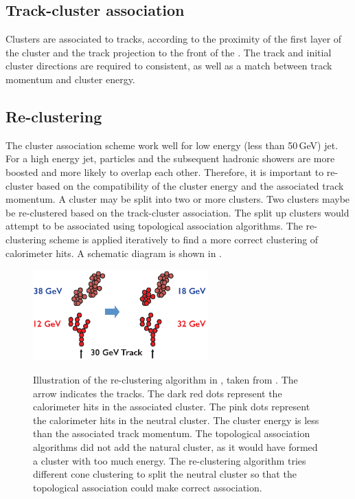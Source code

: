 \subsection{Track-cluster association}

Clusters are associated to tracks, according to the proximity of the first layer of the cluster and the track projection to the front of the \ECAL. The track and initial cluster directions are required to consistent, as well as a match between track momentum and cluster energy.



\subsection{Re-clustering}

The cluster association scheme work well for low energy (less than 50\,GeV) jet. For a high energy jet, particles and the subsequent hadronic showers are more boosted and more likely to overlap each other. Therefore, it is important to re-cluster based on the compatibility of the cluster energy and the associated track momentum. A cluster may be split into two or more clusters. Two clusters maybe be re-clustered based on the track-cluster association. The split up clusters would attempt to be associated using topological association algorithms. The re-clustering scheme is applied iteratively to find a more correct clustering of calorimeter hits. A schematic diagram is shown in .

\begin{figure}[tbph]
\centering
{\includegraphics[width=0.6\textwidth]{pandora/recluster}}%
\caption[Illustration of the re-clustering algorithm in \pandora]
{Illustration of the re-clustering algorithm in \pandora, taken from \cite{Marshall:pandoraLC}. The arrow indicates the tracks. The dark red dots represent the calorimeter hits in the associated cluster. The pink dots represent the calorimeter hits in the neutral cluster. The cluster energy is less than the associated track momentum. The topological association algorithms did not add the natural cluster, as it would have formed a cluster with too much energy. The re-clustering algorithm tries different cone clustering to split the neutral cluster so that the topological association could make correct association.}
\label{fig:pandoraRecluster}
\end{figure}

